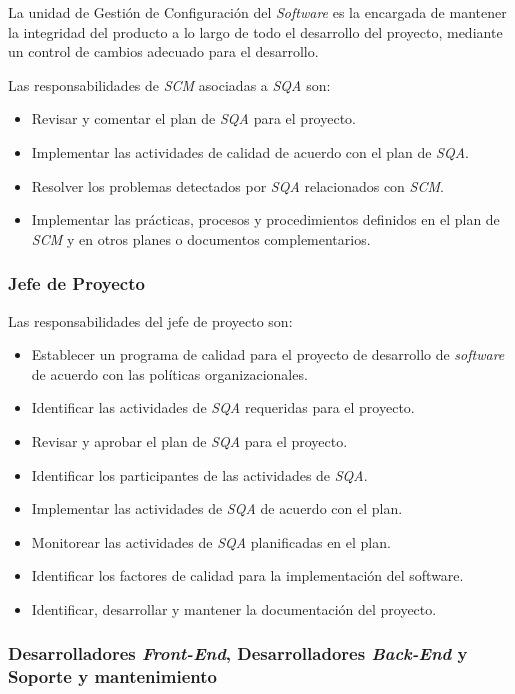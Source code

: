 La unidad de Gestión de Configuración del \textit{Software} es la encargada de mantener la integridad del producto a lo largo de todo el desarrollo del proyecto, mediante un control de cambios adecuado para el desarrollo.

Las responsabilidades de \textit{SCM} asociadas a \textit{SQA} son: 

	\begin{itemize}
		\item 
		Revisar y comentar el plan de \textit{SQA} para el proyecto. 
		\item
		Implementar las actividades de calidad de acuerdo con el plan de \textit{SQA}. 
		 \item
		Resolver los problemas detectados por \textit{SQA} relacionados con \textit{SCM}.
		 \item 
		Implementar las prácticas, procesos y procedimientos definidos en el plan de \textit{SCM} y en otros planes o documentos complementarios.
	\end{itemize}

\subsubsection{Jefe de Proyecto}

Las responsabilidades del jefe de proyecto son:

\begin{itemize}
		\item 
		Establecer un programa de calidad para el proyecto de desarrollo de \textit{software} de acuerdo con las políticas organizacionales.
		\item
		Identificar las actividades de \textit{SQA} requeridas para el proyecto.
		\item
		Revisar y aprobar el plan de \textit{SQA} para el proyecto.
		\item 
		Identificar los participantes de las actividades de \textit{SQA}.
		\item
		Implementar las actividades de \textit{SQA} de acuerdo con el plan.
		\item
		Monitorear las actividades de \textit{SQA} planificadas en el plan.
		\item
		Identificar los factores de calidad para la implementación del software.
		\item
		Identificar, desarrollar y mantener la documentación del proyecto. 
	\end{itemize}

\subsubsection{Desarrolladores \textit{Front-End}, Desarrolladores \textit{Back-End} y Soporte y mantenimiento}

